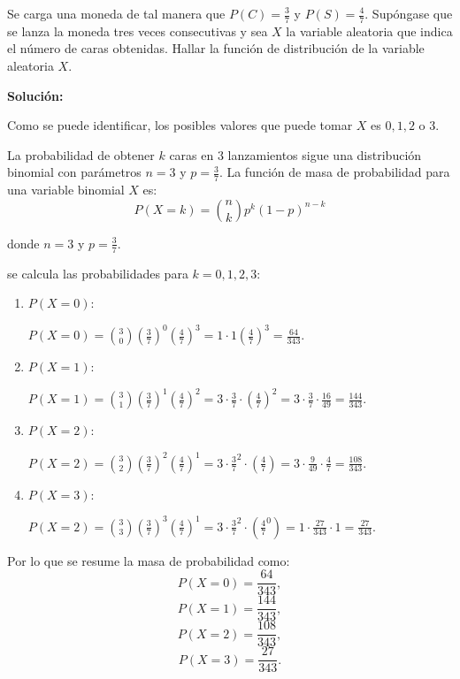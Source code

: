\documentclass[
  us-letterpaper,
]{scrreprt}
\theoremstyle{plain}
\theoremstyle{plain}
\theoremstyle{definition}
\theoremstyle{remark}
\begin{document}
\begin{tcolorbox}[enhanced jigsaw, titlerule=0mm, opacityback=0, coltitle=black, bottomrule=.15mm, colbacktitle=quarto-callout-caution-color!10!white, toprule=.15mm, colback=white, arc=.35mm, colframe=quarto-callout-caution-color-frame, leftrule=.75mm, bottomtitle=1mm, left=2mm, toptitle=1mm, opacitybacktitle=0.6, breakable, title={Ejemplo (\textbf{\emph{Variable aleatoria Binomial}})}, rightrule=.15mm]

Se carga una moneda de tal manera que \(P(C) =\frac{3}{7}\) y
\(P(S)= \frac{4}{7}\). Supóngase que se lanza la moneda tres veces
consecutivas y sea \(X\) la variable aleatoria que indica el número de
caras obtenidas. Hallar la función de distribución de la variable
aleatoria \(X\).

\textbf{Solución:}

Como se puede identificar, los posibles valores que puede tomar \(X\) es
\(0, 1,2\) o \(3\).

La probabilidad de obtener \(k\) caras en \(3\) lanzamientos sigue una
distribución binomial con parámetros \(n=3\) y \(p = \frac{3}{7}\). La
función de masa de probabilidad para una variable binomial \(X\) es:
\[P(X = k) = \binom{n}{k}p^k(1-p)^{n-k}\]

donde \(n=3\) y \(p=\frac{3}{7}\).

se calcula las probabilidades para \(k = 0, 1, 2, 3:\)

\begin{enumerate}
\def\labelenumi{\arabic{enumi}.}
\item
  \(P(X =0):\)

  \(P(X=0) = \binom{3}{0}\left(\frac{3}{7}\right)^0\left(\frac{4}{7}\right)^3 = 1\cdot1\left(\frac{4}{7}\right)^3 = \frac{64}{343}.\)
\item
  \(P(X = 1):\)

  \(P(X=1)=\binom{3}{1}\left(\frac{3}{7}\right)^1\left(\frac{4}{7}\right)^2 = 3\cdot\frac{3}{7}\cdot\left(\frac{4}{7}\right)^2=3\cdot\frac{3}{7}\cdot\frac{16}{49} = \frac{144}{343}.\)
\item
  \(P(X=2):\)

  \(P(X=2)=\binom{3}{2}\left(\frac{3}{7}\right)^2\left(\frac{4}{7}\right)^1 = 3\cdot\frac{3}{7}^2\cdot\left(\frac{4}{7}\right)=3\cdot\frac{9}{49}\cdot\frac{4}{7} = \frac{108}{343}.\)
\item
  \(P(X=3):\)

  \(P(X=2)=\binom{3}{3}\left(\frac{3}{7}\right)^3\left(\frac{4}{7}\right)^1 = 3\cdot\frac{3}{7}^2\cdot\left(\frac{4}{7}^0\right)=1\cdot\frac{27}{343}\cdot1 = \frac{27}{343}.\)
\end{enumerate}

Por lo que se resume la masa de probabilidad como:
\[P(X=0)=\frac{64}{343},\] \[P(X=1)=\frac{144}{343},\]
\[P(X=2)=\frac{108}{343},\] \[P(X=3)=\frac{27}{343}.\]

\end{tcolorbox}
\end{document}
